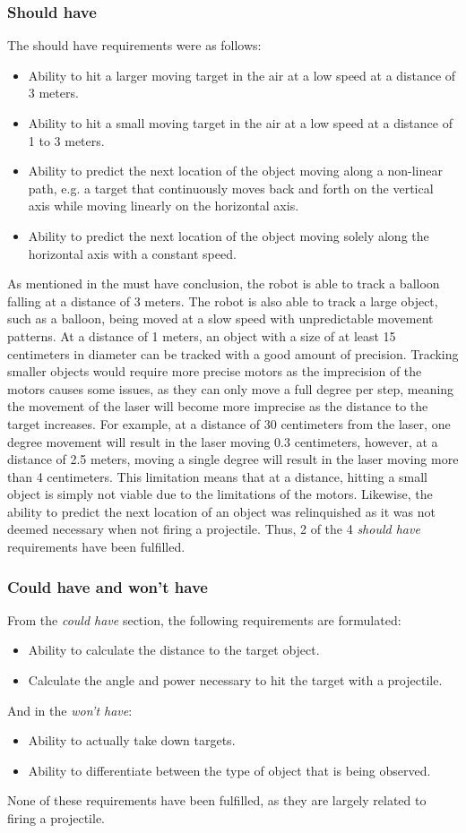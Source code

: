 \subsubsection{Should have}
The should have requirements were as follows:
\begin{itemize}
	\item Ability to hit a larger moving target in the air at a low speed at a distance of 3 meters.
	\item Ability to hit a small moving target in the air at a low speed at a distance of 1 to 3 meters.
	\item Ability to predict the next location of the object moving along a non-linear path, e{.}g{.} a target that continuously moves back and forth on the vertical axis while moving linearly on the horizontal axis.
	\item Ability to predict the next location of the object moving solely along the horizontal axis with a constant speed.
\end{itemize}

As mentioned in the must have conclusion, the robot is able to track a balloon falling at a distance of 3 meters.
The robot is also able to track a large object, such as a balloon, being moved at a slow speed with unpredictable movement patterns.
At a distance of 1 meters, an object with a size of at least 15 centimeters in diameter can be tracked with a good amount of precision.
Tracking smaller objects would require more precise motors as the imprecision of the motors causes some issues, as they can only move a full degree per step, meaning the movement of the laser will become more imprecise as the distance to the target increases.
For example, at a distance of 30 centimeters from the laser, one degree movement will result in the laser moving 0.3 centimeters, however, at a distance of 2.5 meters, moving a single degree will result in the laser moving more than 4 centimeters.
This limitation means that at a distance, hitting a small object is simply not viable due to the limitations of the motors.
Likewise, the ability to predict the next location of an object was relinquished as it was not deemed necessary when not firing a projectile.
Thus, 2 of the 4 \textit{should have} requirements have been fulfilled.

\subsubsection{Could have and won't have}
From the \textit{could have} section, the following requirements are formulated:
\begin{itemize}
	\item Ability to calculate the distance to the target object.
	\item Calculate the angle and power necessary to hit the target with a projectile.
\end{itemize}

And in the \textit{won't have}:
\begin{itemize}
	\item Ability to actually take down targets.
	\item Ability to differentiate between the type of object that is being observed.
\end{itemize}

None of these requirements have been fulfilled, as they are largely related to firing a projectile.


